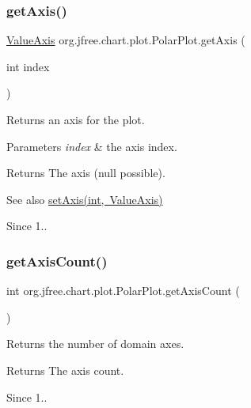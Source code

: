 \subsubsection{\texorpdfstring{get\+Axis()}{getAxis()}\hspace{0.1cm}{\footnotesize\ttfamily [2/2]}}
{\footnotesize\ttfamily \mbox{\hyperlink{classorg_1_1jfree_1_1chart_1_1axis_1_1_value_axis}{Value\+Axis}} org.\+jfree.\+chart.\+plot.\+Polar\+Plot.\+get\+Axis (\begin{DoxyParamCaption}\item[{int}]{index }\end{DoxyParamCaption})}

Returns an axis for the plot.


\begin{DoxyParams}{Parameters}
{\em index} & the axis index.\\
\hline
\end{DoxyParams}
\begin{DoxyReturn}{Returns}
The axis ({\ttfamily null} possible).
\end{DoxyReturn}
\begin{DoxySeeAlso}{See also}
\mbox{\hyperlink{classorg_1_1jfree_1_1chart_1_1plot_1_1_polar_plot_a225b527fcb7ab354ec7ee747564f9b44}{set\+Axis(int, Value\+Axis)}}
\end{DoxySeeAlso}
\begin{DoxySince}{Since}
1.. 
\end{DoxySince}
\mbox{\label{classorg_1_1jfree_1_1chart_1_1plot_1_1_polar_plot_a35d901d725a129506171eff39f5bfe11}} 
\subsubsection{\texorpdfstring{get\+Axis\+Count()}{getAxisCount()}}
{\footnotesize\ttfamily int org.\+jfree.\+chart.\+plot.\+Polar\+Plot.\+get\+Axis\+Count (\begin{DoxyParamCaption}{ }\end{DoxyParamCaption})}

Returns the number of domain axes.

\begin{DoxyReturn}{Returns}
The axis count.
\end{DoxyReturn}
\begin{DoxySince}{Since}
1.. 
\end{DoxySince}
\mbox{\label{classorg_1_1jfree_1_1chart_1_1plot_1_1_polar_plot_a1554ddd2ba4a53039cbf1cd389f5bfe2}} 
